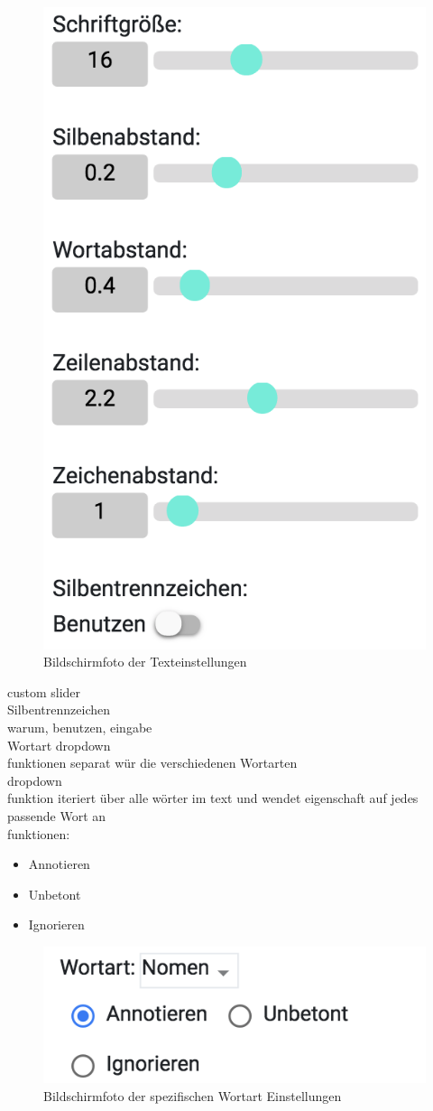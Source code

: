\begin{figure}[h!]
	\centering
	\includegraphics[width=.4\linewidth, frame]{figures/frontend/config-text}
	\caption{Bildschirmfoto der Texteinstellungen}
	\label{fig:frontend-textconf}
\end{figure}

custom slider\\

Silbentrennzeichen\\
warum, benutzen, eingabe\\

Wortart dropdown\\
funktionen separat wür die verschiedenen Wortarten\\
dropdown\\
funktion iteriert über alle wörter im text und wendet eigenschaft auf jedes passende Wort an\\
funktionen:\\
\begin{itemize}
	\item Annotieren
	\item Unbetont
	\item Ignorieren
\end{itemize}

\begin{figure}[h!]
	\centering
	\includegraphics[width=.4\linewidth, frame]{figures/frontend/config-pos}
	\caption{Bildschirmfoto der spezifischen Wortart Einstellungen}
	\label{fig:frontend-pos-einstellungen}
\end{figure}


